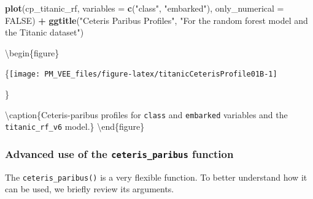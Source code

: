 \documentclass[12pt,]{krantz}
\newenvironment{Shaded}{\begin{snugshade}}{\end{snugshade}}
\newcommand{\DataTypeTok}[1]{\textcolor[rgb]{0.13,0.29,0.53}{#1}}
\newcommand{\KeywordTok}[1]{\textcolor[rgb]{0.13,0.29,0.53}{\textbf{#1}}}
\newcommand{\NormalTok}[1]{#1}
\newcommand{\OperatorTok}[1]{\textcolor[rgb]{0.81,0.36,0.00}{\textbf{#1}}}
\newcommand{\OtherTok}[1]{\textcolor[rgb]{0.56,0.35,0.01}{#1}}
\newcommand{\StringTok}[1]{\textcolor[rgb]{0.31,0.60,0.02}{#1}}
\begin{document}
\begin{Shaded}
\begin{Highlighting}[]
\KeywordTok{plot}\NormalTok{(cp_titanic_rf, }\DataTypeTok{variables =} \KeywordTok{c}\NormalTok{(}\StringTok{"class"}\NormalTok{, }\StringTok{"embarked"}\NormalTok{), }\DataTypeTok{only_numerical =} \OtherTok{FALSE}\NormalTok{) }\OperatorTok{+}
\StringTok{  }\KeywordTok{ggtitle}\NormalTok{(}\StringTok{"Ceteris Paribus Profiles"}\NormalTok{, }\StringTok{"For the random forest model and the Titanic dataset"}\NormalTok{)}
\end{Highlighting}
\end{Shaded}

\textbackslash{}begin\{figure\}

\{\centering \texttt{[image: PM\_VEE\_files/figure-latex/titanicCeterisProfile01B-1]}

\}

\textbackslash{}caption\{Ceteris-paribus profiles for \texttt{class} and \texttt{embarked} variables and the \texttt{titanic\_rf\_v6} model.\}\label{fig:titanicCeterisProfile01B}
\textbackslash{}end\{figure\}

\hypertarget{advanced-use-of-the-ceteris_paribus-function}{%
\subsubsection{\texorpdfstring{Advanced use of the \texttt{ceteris\_paribus} function}{Advanced use of the ceteris\_paribus function}}\label{advanced-use-of-the-ceteris_paribus-function}}

The \texttt{ceteris\_paribus()} is a very flexible function. To better understand how it can be used, we briefly review its arguments.
\end{document}
